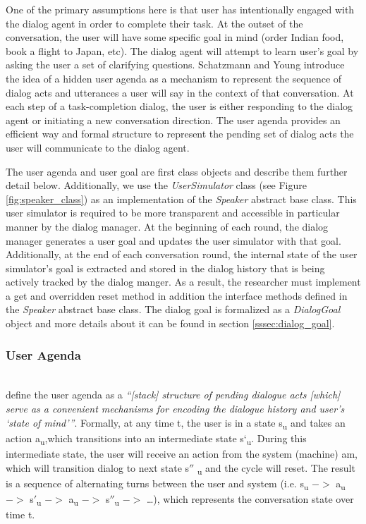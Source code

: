 One of the primary assumptions here is that user has intentionally engaged with the dialog agent in order to complete their task. At the outset of the conversation, the user will have some specific goal in mind (order Indian food, book a flight to Japan, etc). The dialog agent will attempt to learn user's goal by asking the user a set of clarifying questions. Schatzmann and Young introduce the idea of a hidden user agenda as a mechanism to represent the sequence of dialog acts and utterances a user will say in the context of that conversation. At each step of a task-completion dialog, the user is either responding to the dialog agent or initiating a new conversation direction. The user agenda provides an efficient way and formal structure to represent the pending set of dialog acts the user will communicate to the dialog agent.

The user agenda and user goal are first class objects and describe them further detail below. Additionally, we use the \textit{UserSimulator} class (see Figure \ref{fig:speaker_class}) as an implementation of the \textit{Speaker} abstract base class. This user simulator is required to be more transparent and accessible in particular manner by the dialog manager. At the beginning of each round, the dialog manager generates a user goal and updates the user simulator with that goal. Additionally, at the end of each conversation round, the internal state of the user simulator's goal is extracted and stored in the dialog history that is being actively tracked by the dialog manger. As a result, the researcher must implement a get and overridden reset method in addition the interface methods defined in the \textit{Speaker} abstract base class. The dialog goal is formalized as a \textit{DialogGoal} object and more details about it can be found in section \ref{sssec:dialog_goal}. 

\subsubsection{User Agenda} 
~ \\
\cite{Schatzmann2009TheHA} define the user agenda as a \textit{“[stack] structure of pending dialogue acts [which] serve as a convenient mechanisms for encoding the dialogue history and user’s ‘state of mind’”}. Formally, at any time t, the user is in a state s\textsubscript{u} and takes an action a\textsubscript{u},which transitions into an intermediate state s\lq\textsubscript{u}. During this intermediate state, the user will receive an action from the system (machine) am, which will transition dialog to next state s$''$ \textsubscript{u} and the cycle will reset. The result is a sequence of alternating turns between the user and system (i.e. s\textsubscript{u} $->$ a\textsubscript{u} $->$ s$'$\textsubscript{u} $->$ a\textsubscript{u} $->$ s$''$\textsubscript{u} $->$ \dots), which represents the conversation state over time t.

